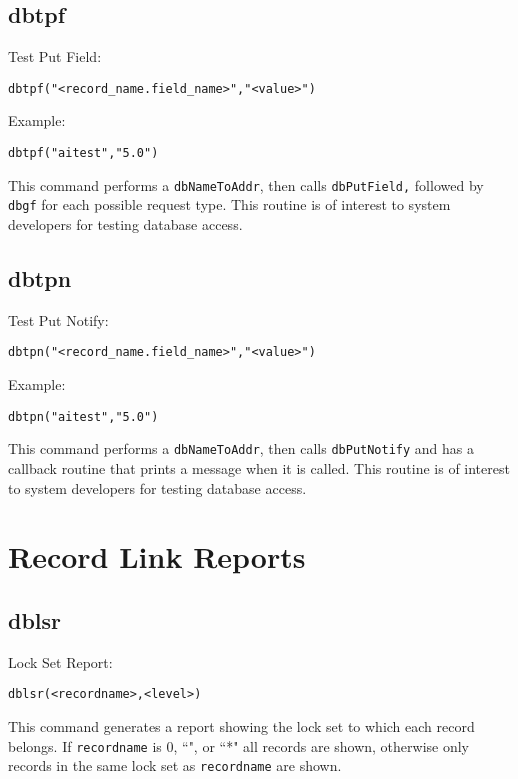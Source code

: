 \subsection{dbtpf}

Test Put Field:

\begin{verbatim}dbtpf("<record_name.field_name>","<value>")
\end{verbatim}Example:

\begin{verbatim}dbtpf("aitest","5.0")
\end{verbatim}This command performs a \verb|dbNameToAddr|, then calls \verb|dbPutField,| followed by \verb|dbgf| for each possible request type. 
This routine is of interest to system developers for testing database access.

\subsection{dbtpn}

Test Put Notify:

\begin{verbatim}dbtpn("<record_name.field_name>","<value>")
\end{verbatim}Example:

\begin{verbatim}dbtpn("aitest","5.0")
\end{verbatim}This command performs a \verb|dbNameToAddr|, then calls \verb|dbPutNotify| and has a callback routine that prints a message 
when it is called. This routine is of interest to system developers for testing database access.

\section{Record Link Reports}

\subsection{dblsr}

Lock Set Report:

\begin{verbatim}dblsr(<recordname>,<level>)
\end{verbatim}This command generates a report showing the lock set to which each record belongs. If \verb|recordname| is 0, ``", or ``*" all 
records are shown, otherwise only records in the same lock set as \verb|recordname| are shown.

